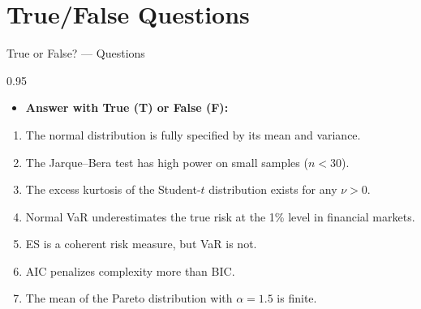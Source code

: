 \documentclass[9pt, aspectratio=169, t]{beamer}
\begin{document}
\section{True/False Questions}

\begin{frame}{True or False? --- Questions}
\begin{cminipage}{0.95\textwidth}
    \begin{itemize}\setlength{\itemsep}{0pt}
        \item \textbf{Answer with True (T) or False (F):}
    \end{itemize}
    \vspace{0.3cm}
    \begin{enumerate}\setlength{\itemsep}{0pt}
        \item The normal distribution is fully specified by its mean and variance.
        \item The Jarque--Bera test has high power on small samples ($n < 30$).
        \item The excess kurtosis of the Student-$t$ distribution exists for any $\nu > 0$.
        \item Normal VaR underestimates the true risk at the 1\% level in financial markets.
        \item ES is a coherent risk measure, but VaR is not.
        \item AIC penalizes complexity more than BIC.
        \item The mean of the Pareto distribution with $\alpha = 1.5$ is finite.
    \end{enumerate}
\end{cminipage}
\end{frame}
\end{document}
